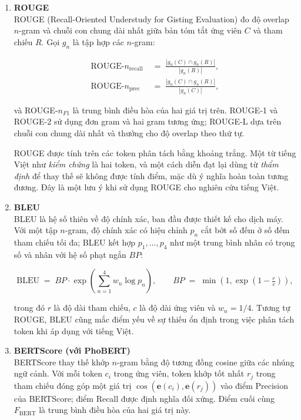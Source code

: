\begin{enumerate}[label=(\alph*), leftmargin=*]

    \item \textbf{ROUGE} \\
    ROUGE \cite{Lin2004} (Recall-Oriented Understudy for Gisting Evaluation) đo độ overlap $n$-gram và chuỗi con chung dài nhất giữa bản tóm tắt ứng viên $C$ và tham chiếu $R$. Gọi $g_n$ là tập hợp các $n$-gram:
    
    \begin{align*}
\text{ROUGE-}n_{\text{recall}} \;&=\; \frac{|g_n(C) \cap g_n(R)|}{|g_n(R)|}, \\
\text{ROUGE-}n_{\text{prec}} \;&=\; \frac{|g_n(C) \cap g_n(R)|}{|g_n(C)|},
\end{align*}
    
    \noindent và ROUGE-$n_{F1}$ là trung bình điều hòa của hai giá trị trên. ROUGE-1 và ROUGE-2 sử dụng đơn gram và hai gram tương ứng; ROUGE-L dựa trên chuỗi con chung dài nhất và thưởng cho độ overlap theo thứ tự.
    
    ROUGE được tính trên các token phân tách bằng khoảng trắng. Một từ tiếng Việt như \textit{kiểm chứng} là hai token, và một cách diễn đạt lại dùng từ \textit{thẩm định} để thay thế sẽ không được tính điểm, mặc dù ý nghĩa hoàn toàn tương đương. Đây là một lưu ý khi sử dụng ROUGE cho nghiên cứu tiếng Việt.

    \item \textbf{BLEU} \\
    BLEU \cite{papineni2002bleu} là hệ số thiên về độ chính xác, ban đầu được thiết kế cho dịch máy. Với một tập $n$-gram, độ chính xác có hiệu chỉnh $p_n$ cắt bớt số đếm ở số đếm tham chiếu tối đa; BLEU kết hợp $p_1, \ldots, p_4$ như một trung bình nhân có trọng số và nhân với hệ số phạt ngắn $BP$:
    
    $$\text{BLEU} \;=\; BP \cdot \exp\!\left(\sum_{n=1}^{4} w_n \log p_n \right),
    \qquad
    BP \;=\; \min\!\left(1, \exp\!\left(1 - \tfrac{r}{c}\right)\right),$$
    
    \noindent trong đó $r$ là độ dài tham chiếu, $c$ là độ dài ứng viên và $w_n = 1/4$. Tương tự ROUGE, BLEU cũng mắc điểm yếu về sự thiếu ổn định trong việc phân tách token khi áp dụng với tiếng Việt.

    \item \textbf{BERTScore (với PhoBERT)} \\
    BERTScore \cite{Zhang2020} thay thế khớp $n$-gram bằng độ tương đồng cosine giữa các nhúng ngữ cảnh. Với mỗi token $c_i$ trong ứng viên, token khớp tốt nhất $r_j$ trong tham chiếu đóng góp một giá trị $\cos(\mathbf{e}(c_i), \mathbf{e}(r_j))$ vào điểm Precision của BERTScore; điểm Recall được định nghĩa đối xứng. Điểm cuối cùng $F_{\text{BERT}}$ là trung bình điều hòa của hai giá trị này.
    

\end{enumerate}
